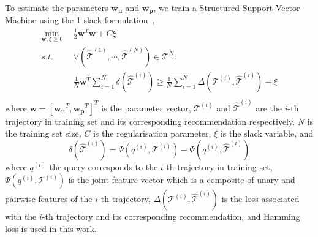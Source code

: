 To estimate the parameters $\mathbf{w_u}$ and $\mathbf{w_p}$, we train a Structured Support Vector Machine
using the 1-slack formulation~\cite{ssvm09},
\begin{align*}
    \min_{\mathbf{w}, \xi \ge 0} ~~& \frac{1}{2} \mathbf{w}^T \mathbf{w} + C \xi \\
    s.t. ~~& \forall \left( \hat{\mathcal{T}}^{(1)}, \cdots, \hat{\mathcal{T}}^{(N)} \right) \in \mathscr{T}^N: \\
         ~~& \frac{1}{N} \mathbf{w}^T \sum_{i=1}^N \delta \left( \hat{\mathcal{T}}^{(i)} \right) \ge
             \frac{1}{N} \sum_{i=1}^N \Delta \left( \mathcal{T}^{(i)}, \hat{\mathcal{T}}^{(i)} \right) - \xi \\
\end{align*}
where $\mathbf{w} = [\mathbf{w_u}^T, \mathbf{w_p}^T]^T$ is the parameter vector,
$\mathcal{T}^{(i)}$ and $\hat{\mathcal{T}}^{(i)}$ are the $i$-th trajectory in training set
and its corresponding recommendation respectively.
$N$ is the training set size, $C$ is the regularisation parameter,
$\xi$ is the slack variable, and
\begin{displaymath}
    \delta \left( \hat{\mathcal{T}}^{(i)} \right) = \Psi \left( q^{(i)}, \mathcal{T}^{(i)} \right) - 
                                                    \Psi \left( q^{(i)}, \hat{\mathcal{T}}^{(i)} \right)
\end{displaymath}
where $q^{(i)}$ the query corresponds to the $i$-th trajectory in training set,
$\Psi \left( q^{(i)}, \mathcal{T}^{(i)} \right)$ is the joint feature vector which is a composite of unary and 
pairwise features of the $i$-th trajectory,
$\Delta \left( \mathcal{T}^{(i)}, \hat{\mathcal{T}}^{(i)} \right)$ is the loss associated with the $i$-th trajectory 
and its corresponding recommendation, and Hamming loss is used in this work.
